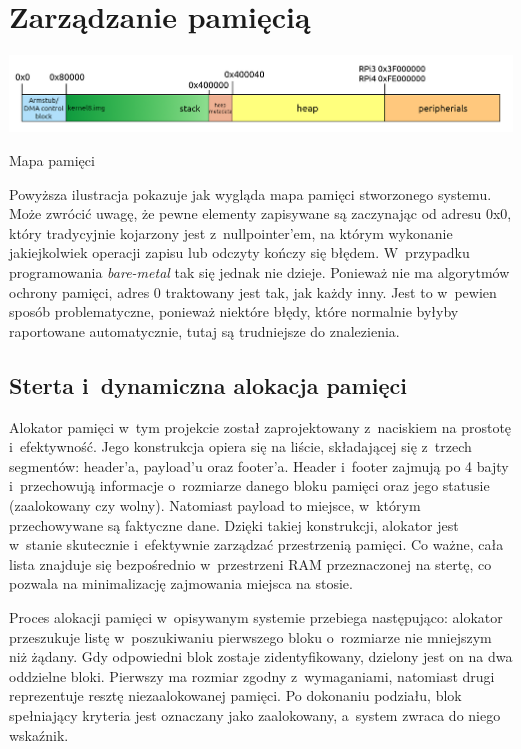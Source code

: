 \documentclass[shortabstract]{iithesis}
\begin{document}
\section{Zarządzanie pamięcią}
\begingroup
\centering
\includegraphics[width=\textwidth]{memorymap.png}
\captionsetup{type=figure}
\caption{Mapa pamięci}
\endgroup
Powyższa ilustracja pokazuje jak wygląda mapa pamięci stworzonego systemu. Może zwrócić uwagę, że pewne elementy zapisywane są zaczynając od adresu 0x0, który tradycyjnie kojarzony jest z~nullpointer'em, na którym wykonanie jakiejkolwiek operacji zapisu lub odczyty kończy się błędem. W~przypadku programowania \textit{bare-metal} tak się jednak nie dzieje. Ponieważ nie ma algorytmów ochrony pamięci, adres 0 traktowany jest tak, jak każdy inny. Jest to w~pewien sposób problematyczne, ponieważ niektóre błędy, które normalnie byłyby raportowane automatycznie, tutaj są trudniejsze do znalezienia.
\subsection{Sterta i~dynamiczna alokacja pamięci}
Alokator pamięci w~tym projekcie został zaprojektowany z~naciskiem na prostotę i~efektywność. Jego konstrukcja opiera się na liście, składającej się z~trzech segmentów: header'a, payload'u oraz footer'a. Header i~footer zajmują po 4 bajty i~przechowują informacje o~rozmiarze danego bloku pamięci oraz jego statusie (zaalokowany czy wolny). Natomiast payload to miejsce, w~którym przechowywane są faktyczne dane. Dzięki takiej konstrukcji, alokator jest w~stanie skutecznie i~efektywnie zarządzać przestrzenią pamięci. Co ważne, cała lista znajduje się bezpośrednio w~przestrzeni RAM przeznaczonej na stertę, co pozwala na minimalizację zajmowania miejsca na stosie. 

Proces alokacji pamięci w~opisywanym systemie przebiega następująco: alokator przeszukuje listę w~poszukiwaniu pierwszego bloku o~rozmiarze nie mniejszym niż żądany. Gdy odpowiedni blok zostaje zidentyfikowany, dzielony jest on na dwa oddzielne bloki. Pierwszy ma rozmiar zgodny z~wymaganiami, natomiast drugi reprezentuje resztę niezaalokowanej pamięci. Po dokonaniu podziału, blok spełniający kryteria jest oznaczany jako zaalokowany, a~system zwraca do niego wskaźnik.
\end{document}
